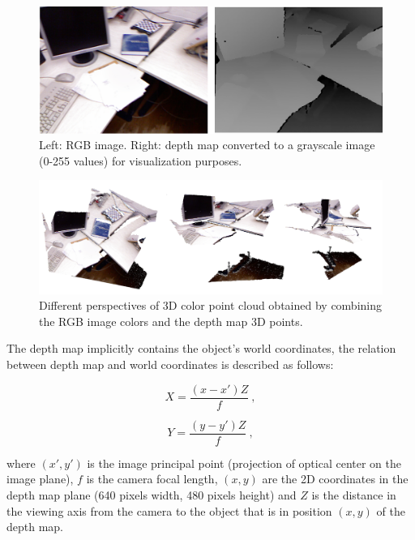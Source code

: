 \begin{figure}[H]
\begin{center}
\includegraphics[scale=0.3]{images/color_depth.png}
\caption{Left: RGB image. Right: depth map converted to a grayscale image (0-255 values) for visualization purposes.}
\label{fig:colordepth}
\end{center}
\end{figure}


\begin{figure}[H]
\begin{center}
\includegraphics[scale=0.25]{images/3d_point_cloud.png}
\caption{Different perspectives of 3D color point cloud obtained by combining the RGB image colors and the depth map 3D points.}
\label{fig:colorpcloud}
\end{center}
\end{figure}


The depth map implicitly contains the object's world coordinates, the relation between depth map 
and world coordinates is described as follows:

\begin{equation}
\label{eq:depthmapx}
 X=\frac{(x-x')Z}{f}\ ,
\end{equation}

\begin{equation}
\label{eq:depthmapy}
 Y=\frac{(y-y')Z}{f}\ ,
\end{equation}


\noindent where $(x',y')$ is the image principal point (projection of optical center on the image plane), $f$ is the camera 
focal length, $(x,y)$ are the 2D coordinates in the depth map plane (640 pixels width, 480 pixels height) and $Z$ is the distance in the viewing axis from the camera to the object that is in position $(x,y)$ of the depth map.

